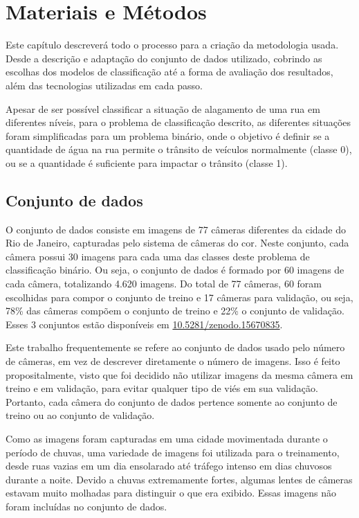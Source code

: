 \chapter{Materiais e Métodos}\label{cap:metodologia}

Este capítulo descreverá todo o processo para a criação da metodologia usada.
Desde a descrição e adaptação do conjunto de dados utilizado, cobrindo as escolhas dos modelos de classificação até a forma de avaliação dos resultados,
além das tecnologias utilizadas em cada passo.

Apesar de ser possível classificar a situação de alagamento de uma rua em diferentes níveis, para o problema de classificação descrito,
as diferentes situações foram simplificadas para um problema binário, onde o objetivo é definir se a quantidade de água na rua permite o trânsito de veículos normalmente (classe 0),
ou se a quantidade é suficiente para impactar o trânsito (classe 1).

\section{Conjunto de dados}\label{sec:dataset}

O conjunto de dados consiste em imagens de 77 câmeras diferentes da cidade do Rio de Janeiro, capturadas pelo sistema de câmeras do \Acrfull{cor}.
Neste conjunto, cada câmera possui 30 imagens para cada uma das classes deste problema de classificação binário.
Ou seja, o conjunto de dados é formado por 60 imagens de cada câmera, totalizando 4.620 imagens.
Do total de 77 câmeras, 60 foram escolhidas para compor o conjunto de treino e 17 câmeras para validação, ou seja, 78\% das câmeras compõem o conjunto de treino e 22\% o conjunto de validação.
Esses 3 conjuntos estão disponíveis em \href{https://doi.org/10.5281/zenodo.15670835}{10.5281/zenodo.15670835}.

Este trabalho frequentemente se refere ao conjunto de dados usado pelo número de câmeras, em vez de descrever diretamente o número de imagens.
Isso é feito propositalmente, visto que foi decidido não utilizar imagens da mesma câmera em treino e em validação, para evitar qualquer tipo de viés em sua validação.
Portanto, cada câmera do conjunto de dados pertence somente ao conjunto de treino ou ao conjunto de validação.

Como as imagens foram capturadas em uma cidade movimentada durante o período de chuvas, uma variedade de imagens foi utilizada para o treinamento,
desde ruas vazias em um dia ensolarado até tráfego intenso em dias chuvosos durante a noite.
Devido a chuvas extremamente fortes, algumas lentes de câmeras estavam muito molhadas para distinguir o que era exibido. Essas imagens não foram incluídas no conjunto de dados.


